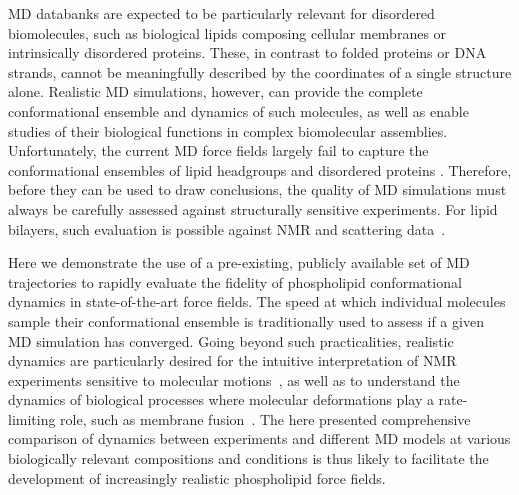 \documentclass[journal=jcisd8,manuscript=article,layout=twocolumn]{achemso}
\begin{document}
MD databanks are expected to be particularly relevant for disordered biomolecules, such as
biological lipids composing cellular membranes or intrinsically disordered proteins.
These, in contrast to folded proteins or DNA strands,
cannot be meaningfully described by the coordinates of a single structure alone.
Realistic MD simulations, however,
can provide the complete conformational ensemble and dynamics of such molecules, as well as
enable studies of their biological functions in complex biomolecular assemblies.
Unfortunately, the current MD force fields largely fail to capture the conformational ensembles of lipid headgroups and
disordered proteins \cite{botan15,Antila:2019a,robustelli18,henriques18,virtanen20}.
Therefore, before they can be used to draw conclusions,
the quality of MD simulations
must always be carefully assessed against structurally sensitive experiments.
For lipid bilayers, such evaluation is possible against NMR and scattering data~\cite{Ollila:2016a}.

Here we demonstrate the use of a pre-existing, publicly available set of MD trajectories to
rapidly evaluate the fidelity of phospholipid conformational dynamics in state-of-the-art force fields.
The speed at which individual molecules sample their conformational ensemble
is traditionally used to assess if a given MD simulation has converged.
Going beyond such practicalities,
realistic dynamics are particularly desired for the intuitive interpretation of NMR %
experiments sensitive to molecular motions~\cite{Antila:2020a},
as well as to understand the dynamics of biological processes where
molecular deformations play a rate-limiting role, such as membrane fusion~\cite{han17}.
%
%
The here presented comprehensive comparison of dynamics between experiments and different MD models %
at various biologically relevant compositions and conditions is thus likely to facilitate the development of increasingly realistic phospholipid force fields. 
\end{document}
